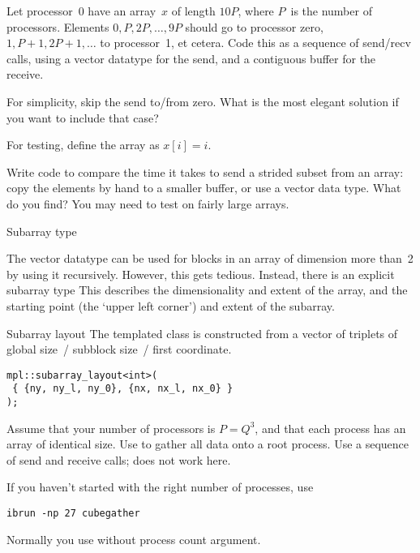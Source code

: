 \begin{exercise}
  \label{ex:stridesend}
  Let processor~0 have an array~$x$ of length $10P$, where $P$~is the number of processors.
  Elements $0,P,2P,\ldots,9P$ should go to processor zero, $1,P+1,2P+1,\ldots$ to processor~1,
  et cetera. Code this as a sequence of send/recv calls, using a vector datatype
  for the send, and a contiguous buffer for the receive.

  For simplicity, skip the send to/from zero. What is the most elegant
  solution if you want to include that case?

  For testing, define the array as $x[i]=i$.
\end{exercise}

\begin{exercise}
  Write code to compare the time it takes to send a strided subset
  from an array: copy the elements by hand to a smaller buffer, or use
  a vector data type. What do you find? You may need to test on fairly
  large arrays.
\end{exercise}

 {Subarray type}
\label{sec:type_subarray}

The vector datatype can be used for blocks in an array of dimension
more than~2 by using it recursively. However, this gets
tedious. Instead, there is an explicit subarray type
%
%
This describes the dimensionality and extent of the array, and
the starting point (the `upper left corner') and extent of the
subarray.

\begin{mplnote}{Subarray layout}
  The templated  class is constructed
  from a vector of triplets of global size~/ subblock size~/ first coordinate.
\begin{lstlisting}
mpl::subarray_layout<int>( 
 { {ny, ny_l, ny_0}, {nx, nx_l, nx_0} }
);  
\end{lstlisting}
\end{mplnote}

\begin{exercise}
  \label{ex:cubegather}

  Assume that your number of processors is $P=Q^3$, and that each
  process has an array of identical size. Use
   to gather all data onto a root process.
  Use a sequence of send and receive calls;
   does not work here.

\begin{tacc}
If you haven't started  with the right number of processes,
use
\begin{verbatim}
ibrun -np 27 cubegather
\end{verbatim}
Normally you use  without process count argument.
\end{tacc}

\end{exercise}

